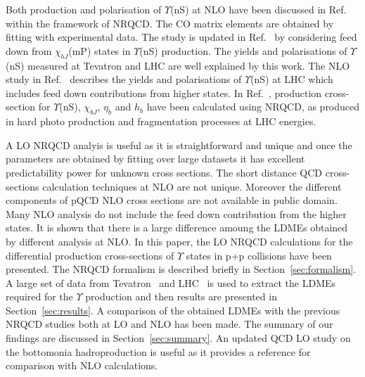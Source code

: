 Both production and polarisation of $\Upsilon$(nS) at NLO have been discussed in 
Ref.~\cite{Gong:2013qka} within the framework of NRQCD. The CO matrix elements are obtained
by fitting with experimental data. The study is updated in Ref.~\cite{Feng:2015wka} by considering
feed down from $\chi_{bJ}$(mP) states in $\Upsilon$(nS) production. The yields and
polarisations of $\Upsilon$(nS) measured at Tevatron and LHC are well explained by this work.
The NLO study in Ref.~\cite{Han:2014kxa} describes the yields and polarisations of
$\Upsilon$(nS) at LHC which includes feed down contributions from
higher states. In Ref.~\cite{Yu:2017pot}, production cross-section for $\Upsilon$(nS),
$\chi_{bJ}$, $\eta_b$ and $h_b$ have been calculated using NRQCD, as produced in hard
photo production and fragmentation processes at LHC energies. 

A LO NRQCD analyis is useful as it is straightforward and unique and once the parameters are
obtained by fitting over large datasets it has excellent predictability power for unknown cross
sections. The short distance QCD cross-sections calculation techniques at NLO are not unique.
Moreover the different components of pQCD NLO cross sections are not available in
public domain. Many NLO analysis do not include the feed down contribution from the higher
states. It is shown that there is a large difference amoung the LDMEs obtained by different
analysis at NLO. In this paper, the LO NRQCD calculations for the differential production
cross-sections of $\Upsilon$ states in p+p collisions have been presented.
The NRQCD formalism is described
briefly in Section~\ref{sec:formalism}. 
A large set of data from Tevatron~\cite{Acosta:2001gv} and
LHC~\cite{LHCb:2012aa,Khachatryan:2015qpa,Aad:2012dlq,Chatrchyan:2013yna,Sirunyan:2017qdw} 
is used to extract the LDMEs required for the $\Upsilon$ production and then results are
presented in Section~\ref{sec:results}. A comparison of the obtained LDMEs with the
previous NRQCD studies both at LO and NLO has been made. The summary 
of our findings are discussed in Section~\ref{sec:summary}. An updated QCD LO study on the
bottomonia hadroproduction is useful as it provides a reference for comparison
with NLO calculations. 





